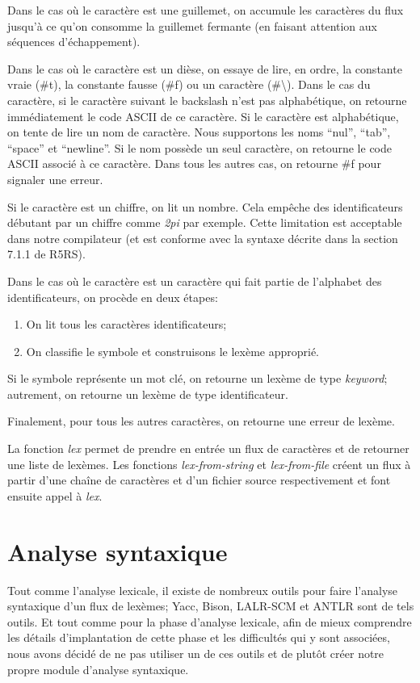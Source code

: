 \documentclass[11pt]{report}
\begin{document}
Dans le cas où le caractère est une guillemet, on accumule les
caractères du flux jusqu'à ce qu'on consomme la guillemet fermante (en
faisant attention aux séquences d'échappement).

Dans le cas où le caractère est un dièse, on essaye de lire, en ordre,
la constante vraie (\#t), la constante fausse (\#f) ou un caractère
(\#\textbackslash).  Dans le cas du caractère, si le caractère suivant
le backslash n'est pas alphabétique, on retourne immédiatement le code
ASCII de ce caractère.  Si le caractère est alphabétique, on tente de
lire un nom de caractère.  Nous supportons les noms ``nul'', ``tab'',
``space'' et ``newline''.  Si le nom possède un seul caractère, on
retourne le code ASCII associé à ce caractère.  Dans tous les autres
cas, on retourne \#f pour signaler une erreur.

Si le caractère est un chiffre, on lit un nombre.  Cela empêche des
identificateurs débutant par un chiffre comme \emph{2pi} par exemple.
Cette limitation est acceptable dans notre compilateur (et est
conforme avec la syntaxe décrite dans la section 7.1.1 de R5RS).

Dans le cas où le caractère est un caractère qui fait partie de
l'alphabet des identificateurs, on procède en deux étapes:

\begin{enumerate}
\item On lit tous les caractères identificateurs;
\item On classifie le symbole et construisons le lexème approprié.
\end{enumerate}

Si le symbole représente un mot clé, on retourne un lexème de type
\emph{keyword}; autrement, on retourne un lexème de type
identificateur.

Finalement, pour tous les autres caractères, on retourne une erreur de
lexème.

La fonction \emph{lex} permet de prendre en entrée un flux de
caractères et de retourner une liste de lexèmes.  Les fonctions
\emph{lex-from-string} et \emph{lex-from-file} créent un flux à partir
d'une chaîne de caractères et d'un fichier source respectivement et
font ensuite appel à \emph{lex}.


\section{Analyse syntaxique}

Tout comme l'analyse lexicale, il existe de nombreux outils pour faire
l'analyse syntaxique d'un flux de lexèmes; Yacc, Bison, LALR-SCM et
ANTLR sont de tels outils.  Et tout comme pour la phase d'analyse
lexicale, afin de mieux comprendre les détails d'implantation de cette
phase et les difficultés qui y sont associées, nous avons décidé de ne
pas utiliser un de ces outils et de plutôt créer notre propre module
d'analyse syntaxique.
\end{document}
